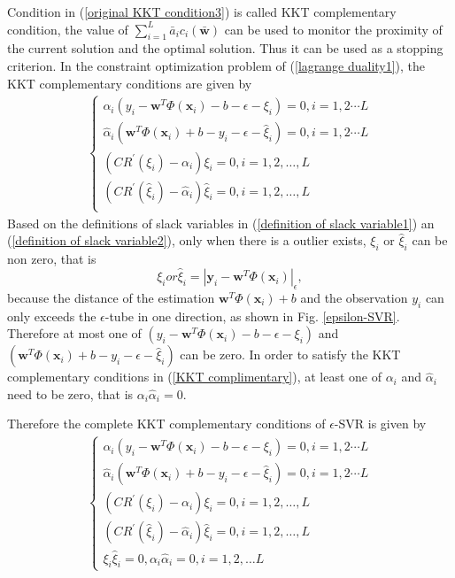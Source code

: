 Condition in (\ref{original KKT condition3}) is called KKT complementary condition, the value of $\sum_{i=1}^{L}\bar{a}_{i}c_{i}(\bar{\mathbf{w}})$ can be used to monitor the proximity of the current solution and the optimal solution. Thus it can be used as a stopping criterion. In the constraint optimization problem of (\ref{lagrange duality1}), the KKT complementary conditions are given by 
\begin{eqnarray}
\left\{\begin{array}{cc}
\alpha_{i}(y_{i}-\mathbf{w}^{T}\Phi(\mathbf{x}_{i})-b-\epsilon-\xi_{i})=0, i=1,2\cdots L\\
\hat{\alpha}_{i}(\mathbf{w}^{T}\Phi(\mathbf{x}_{i})+b-y_{i}-\epsilon-\hat{\xi}_{i})=0, i=1,2\cdots L\\
(CR^{'}(\xi_{i})-\alpha_{i})\xi_{i}=0, i=1,2,\ldots, L\\
(CR^{'}(\hat{\xi}_{i})-\hat{\alpha}_{i})\hat{\xi}_{i}=0, i=1,2,\ldots, L\\
\end{array}\right. 
\label{KKT complimentary}
\end{eqnarray}
Based on the definitions of slack variables in (\ref{definition of slack variable1}) an (\ref{definition of slack variable2}), only when there is a outlier exists, $\xi_{i}$ or $\hat{\xi}_{i}$ can be non zero, that is 
\begin{equation}
\xi_{i} or \hat{\xi}_{i}=|\mathbf{y}_{i}-\mathbf{w}^{T}\Phi(\mathbf{x}_{i})|_{\epsilon},
\label{definition of slack variable3}
\end{equation} 
because the distance of the estimation $\mathbf{w}^{T}\Phi(\mathbf{x}_{i})+b$ and the observation $y_{i}$ can only exceeds the $\epsilon$-tube in one direction, as shown in Fig. \ref{epsilon-SVR}. Therefore at most one of $(y_{i}-\mathbf{w}^{T}\Phi(\mathbf{x}_{i})-b-\epsilon-\xi_{i})$  and $(\mathbf{w}^{T}\Phi(\mathbf{x}_{i})+b-y_{i}-\epsilon-\hat{\xi}_{i})$ can be zero. In order to satisfy the KKT complementary conditions in (\ref{KKT complimentary}), at least one of $\alpha_{i}$ and $\hat{\alpha}_{i}$ need to be zero, that is $\alpha_{i}\hat{\alpha}_{i}=0$. 

Therefore the complete KKT complementary conditions of $\epsilon$-SVR is given by
\begin{eqnarray}
\left\{\begin{array}{cc}
\alpha_{i}(y_{i}-\mathbf{w}^{T}\Phi(\mathbf{x}_{i})-b-\epsilon-\xi_{i})=0, i=1,2\cdots L\\
\hat{\alpha}_{i}(\mathbf{w}^{T}\Phi(\mathbf{x}_{i})+b-y_{i}-\epsilon-\hat{\xi}_{i})=0, i=1,2\cdots L\\
(CR^{'}(\xi_{i})-\alpha_{i})\xi_{i}=0, i=1,2,\ldots, L\\
(CR^{'}(\hat{\xi}_{i})-\hat{\alpha}_{i})\hat{\xi}_{i}=0, i=1,2,\ldots, L\\
\xi_{i}\hat{\xi}_{i}=0, \alpha_{i}\hat{\alpha}_{i}=0, i=1,2,\ldots L
\end{array}\right. 
\label{complete KKT complimentary}
\end{eqnarray}


